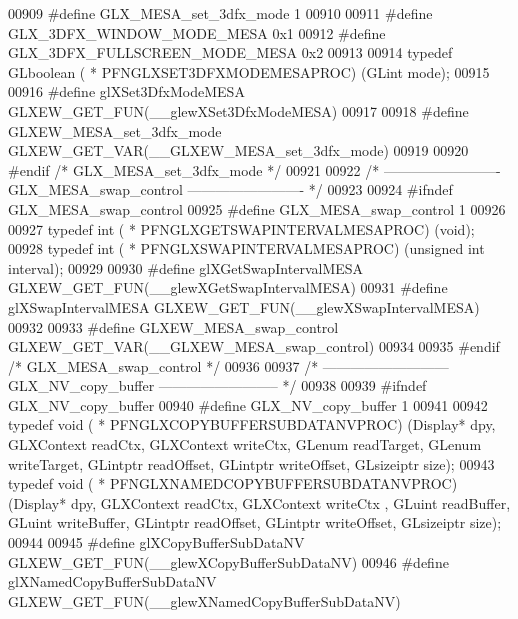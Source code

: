 \begin{DoxyCode}
00909 \textcolor{preprocessor}{#define GLX\_MESA\_set\_3dfx\_mode 1}
00910 
00911 \textcolor{preprocessor}{#define GLX\_3DFX\_WINDOW\_MODE\_MESA 0x1}
00912 \textcolor{preprocessor}{#define GLX\_3DFX\_FULLSCREEN\_MODE\_MESA 0x2}
00913 
00914 \textcolor{keyword}{typedef} GLboolean ( * PFNGLXSET3DFXMODEMESAPROC) (GLint mode);
00915 
00916 \textcolor{preprocessor}{#define glXSet3DfxModeMESA GLXEW\_GET\_FUN(\_\_glewXSet3DfxModeMESA)}
00917 
00918 \textcolor{preprocessor}{#define GLXEW\_MESA\_set\_3dfx\_mode GLXEW\_GET\_VAR(\_\_GLXEW\_MESA\_set\_3dfx\_mode)}
00919 
00920 \textcolor{preprocessor}{#endif }\textcolor{comment}{/* GLX\_MESA\_set\_3dfx\_mode */}\textcolor{preprocessor}{}
00921 
00922 \textcolor{comment}{/* ------------------------- GLX\_MESA\_swap\_control ------------------------- */}
00923 
00924 \textcolor{preprocessor}{#ifndef GLX\_MESA\_swap\_control}
00925 \textcolor{preprocessor}{#define GLX\_MESA\_swap\_control 1}
00926 
00927 \textcolor{keyword}{typedef} int ( * PFNGLXGETSWAPINTERVALMESAPROC) (void);
00928 \textcolor{keyword}{typedef} int ( * PFNGLXSWAPINTERVALMESAPROC) (\textcolor{keywordtype}{unsigned} \textcolor{keywordtype}{int} interval);
00929 
00930 \textcolor{preprocessor}{#define glXGetSwapIntervalMESA GLXEW\_GET\_FUN(\_\_glewXGetSwapIntervalMESA)}
00931 \textcolor{preprocessor}{#define glXSwapIntervalMESA GLXEW\_GET\_FUN(\_\_glewXSwapIntervalMESA)}
00932 
00933 \textcolor{preprocessor}{#define GLXEW\_MESA\_swap\_control GLXEW\_GET\_VAR(\_\_GLXEW\_MESA\_swap\_control)}
00934 
00935 \textcolor{preprocessor}{#endif }\textcolor{comment}{/* GLX\_MESA\_swap\_control */}\textcolor{preprocessor}{}
00936 
00937 \textcolor{comment}{/* --------------------------- GLX\_NV\_copy\_buffer -------------------------- */}
00938 
00939 \textcolor{preprocessor}{#ifndef GLX\_NV\_copy\_buffer}
00940 \textcolor{preprocessor}{#define GLX\_NV\_copy\_buffer 1}
00941 
00942 \textcolor{keyword}{typedef} void ( * PFNGLXCOPYBUFFERSUBDATANVPROC) (Display* dpy, GLXContext readCtx, GLXContext writeCtx, 
      GLenum readTarget, GLenum writeTarget, GLintptr readOffset, GLintptr writeOffset, 
      GLsizeiptr size);
00943 \textcolor{keyword}{typedef} void ( * PFNGLXNAMEDCOPYBUFFERSUBDATANVPROC) (Display* dpy, GLXContext readCtx, GLXContext writeCtx
      , GLuint readBuffer, GLuint writeBuffer, GLintptr readOffset, GLintptr writeOffset, 
      GLsizeiptr size);
00944 
00945 \textcolor{preprocessor}{#define glXCopyBufferSubDataNV GLXEW\_GET\_FUN(\_\_glewXCopyBufferSubDataNV)}
00946 \textcolor{preprocessor}{#define glXNamedCopyBufferSubDataNV GLXEW\_GET\_FUN(\_\_glewXNamedCopyBufferSubDataNV)}

\end{DoxyCode}
